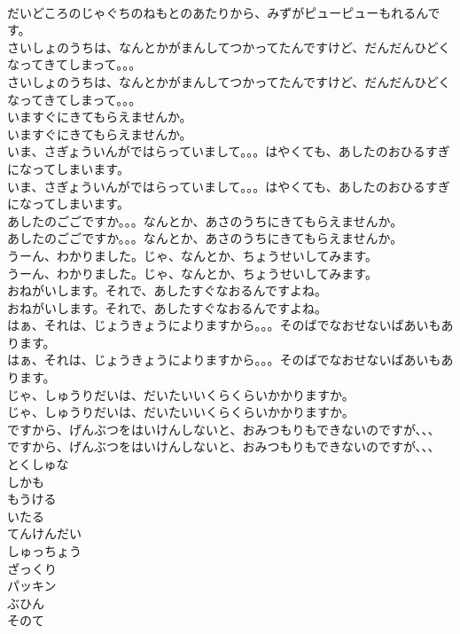 \documentclass[8pt]{extreport}
\begin{document}
\begin{CJK}{UTF8}{min}
\\	だいどころのじゃぐちのねもとのあたりから、みずがピューピューもれるんです。
\\	さいしょのうちは、なんとかがまんしてつかってたんですけど、だんだんひどくなってきてしまって。。。
\\	さいしょのうちは、なんとかがまんしてつかってたんですけど、だんだんひどくなってきてしまって。。。
\\	いますぐにきてもらえませんか。
\\	いますぐにきてもらえませんか。
\\	いま、さぎょういんがではらっていまして。。。はやくても、あしたのおひるすぎになってしまいます。
\\	いま、さぎょういんがではらっていまして。。。はやくても、あしたのおひるすぎになってしまいます。
\\	あしたのごごですか。。。なんとか、あさのうちにきてもらえませんか。
\\	あしたのごごですか。。。なんとか、あさのうちにきてもらえませんか。
\\	うーん、わかりました。じゃ、なんとか、ちょうせいしてみます。
\\	うーん、わかりました。じゃ、なんとか、ちょうせいしてみます。
\\	おねがいします。それで、あしたすぐなおるんですよね。
\\	おねがいします。それで、あしたすぐなおるんですよね。
\\	はぁ、それは、じょうきょうによりますから。。。そのばでなおせないばあいもあります。
\\	はぁ、それは、じょうきょうによりますから。。。そのばでなおせないばあいもあります。
\\	じゃ、しゅうりだいは、だいたいいくらくらいかかりますか。
\\	じゃ、しゅうりだいは、だいたいいくらくらいかかりますか。
\\	ですから、げんぶつをはいけんしないと、おみつもりもできないのですが、、、
\\	ですから、げんぶつをはいけんしないと、おみつもりもできないのですが、、、
\\	とくしゅな
\\	しかも
\\	もうける
\\	いたる
\\	てんけんだい
\\	しゅっちょう
\\	ざっくり
\\	パッキン
\\	ぶひん
\\	そのて

\end{CJK}
\end{document}
